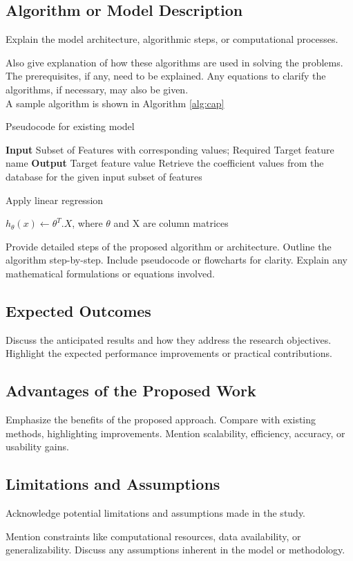 \subsection{Algorithm or Model Description}

Explain the model architecture, algorithmic steps, or computational processes.

Also give explanation of how these algorithms are used in solving the problems. The prerequisites, if any, need to be explained.
Any equations to clarify the algorithms, if necessary, may also be given.\\

A sample algorithm is shown in Algorithm \ref{alg:cap}

\begin{algorithm}[h]
\caption{Pseudocode for existing model }\label{alg:cap}
\begin{algorithmic}[1]
\State \textbf{Input} Subset of Features with corresponding values; Required Target feature name\;
\State \textbf{Output} Target feature value\;
\State Retrieve the coefficient values from the database for the given input subset of features\;

\State Apply linear regression\;
    
    \State $h_\theta(x)\gets \theta^T.X$,
    where $\theta$ and X are column matrices \;

    
\EndFor
\end{algorithmic}

\end{algorithm}


 Provide detailed steps of the proposed algorithm or architecture.
Outline the algorithm step-by-step.
Include pseudocode or flowcharts for clarity.
Explain any mathematical formulations or equations involved.
\subsection{ Expected Outcomes}
Discuss the anticipated results and how they address the research objectives.
Highlight the expected performance improvements or practical contributions.

\subsection{Advantages of the Proposed Work}
 Emphasize the benefits of the proposed approach.
Compare with existing methods, highlighting improvements.
Mention scalability, efficiency, accuracy, or usability gains.
\subsection{Limitations and Assumptions}
 Acknowledge potential limitations and assumptions made in the study.

Mention constraints like computational resources, data availability, or generalizability.
Discuss any assumptions inherent in the model or methodology.

